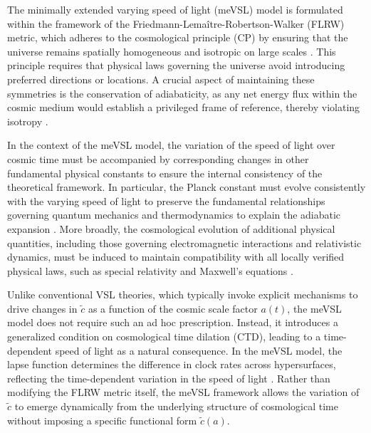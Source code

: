 \documentclass[jkps,preprint,fleqn]{revtex4} %
\newcommand{\tc}{\tilde{c}}
\begin{document}
The minimally extended varying speed of light (meVSL) model is formulated within the framework of the Friedmann-Lemaître-Robertson-Walker (FLRW) metric, which adheres to the cosmological principle (CP) by ensuring that the universe remains spatially homogeneous and isotropic on large scales \cite{Lee:2020zts,Lee:2023bjz,Lee:2024mal}. This principle requires that physical laws governing the universe avoid introducing preferred directions or locations. A crucial aspect of maintaining these symmetries is the conservation of adiabaticity, as any net energy flux within the cosmic medium would establish a privileged frame of reference, thereby violating isotropy \cite{Lee:2022heb}.

In the context of the meVSL model, the variation of the speed of light over cosmic time must be accompanied by corresponding changes in other fundamental physical constants to ensure the internal consistency of the theoretical framework. In particular, the Planck constant must evolve consistently with the varying speed of light to preserve the fundamental relationships governing quantum mechanics and thermodynamics to explain the adiabatic expansion \cite{Lee:2022heb}. More broadly, the cosmological evolution of additional physical quantities, including those governing electromagnetic interactions and relativistic dynamics, must be induced to maintain compatibility with all locally verified physical laws, such as special relativity and Maxwell’s equations \cite{Lee:2020zts,Lee:2023bjz,Lee:2024mal,Lee:2022heb}.

Unlike conventional VSL theories, which typically invoke explicit mechanisms to drive changes in $\tc$ as a function of the cosmic scale factor $a(t)$, the meVSL model does not require such an ad hoc prescription. Instead, it introduces a generalized condition on cosmological time dilation (CTD), leading to a time-dependent speed of light as a natural consequence. In the meVSL model, the lapse function determines the difference in clock rates across hypersurfaces, reflecting the time-dependent variation in the speed of light \cite{Lee:2024zcu}.  Rather than modifying the FLRW metric itself, the meVSL framework allows the variation of $\tc$ to emerge dynamically from the underlying structure of cosmological time without imposing a specific functional form $\tc(a)$.  
\end{document}
